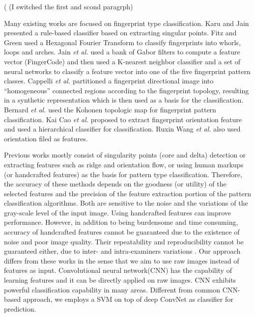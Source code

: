 %
({\color{red} (I switched the first and scond paragrph)}

Many existing works are focused on fingerprint type classification.
%
Karu and Jain \cite{karuJain1996} presented a rule-based classifier based on extracting singular points. 
%
Fitz and Green \cite{FitzGreen1996} used a Hexagonal Fourier Transform to classify fingerprints into whorls, loops and arches. 
%
Jain \textit{et al.} \cite{JainSalil1999} used a bank of Gabor filters to compute a feature vector (FingerCode) and then used a K-nearest neighbor classifier and a set of neural networks to classify a feature vector into one of the five fingerprint pattern classes.
%
Cappelli \textit{et al.} \cite{cappelli1999} partitioned a fingerprint directional image into ``homogeneous'' connected regions according to the fingerprint topology, resulting in a synthetic representation which is then used as a basis for the classification.
%
Bernard \textit{et al.} \cite{Bernard2001} used the Kohonen topologic map for fingerprint pattern classification. 
%
Kai Cao \textit{et al.}\cite{cao2013fingerprint} proposed to extract fingerprint orientation feature and used a hierarchical classifier for classification.
%
Ruxin Wang \textit{et al.} \cite{wang2014fingerprint} also used orientation filed as features. %


Previous works mostly consist of singularity points (core and delta) detection or extracting features such as ridge and orientation flow, or using human markups (or handcrafted features) as the basis for pattern type classification. 
%
Therefore, the accuracy of these methods depends on the goodness (or utility) of the selected features and the precision of the feature extraction portion of the pattern classification algorithms. Both are sensitive to the noise and the variations of the gray-scale level of the input image.  
%
Using handcrafted features can improve performance.  However, in addition to being burdensome and time consuming, accuracy of handcrafted features cannot be guaranteed due to the existence of noise and poor image quality. 
%
Their repeatability and reproducibility cannot be guaranteed either, due to inter- and intra-examiners variations \cite{fbiBlackbox}.  
%
Our approach differs from these works in the sense that we aim to use raw images instead of features as input. Convolutional neural network(CNN) has the capability of learning features and it can be directly applied on raw images. CNN exhibits powerful classification capability in many areas\cite{lecun2015deep}\cite{szegedy2016rethinking}.
%
Different from common CNN-based approach, we employs a SVM on top of deep ConvNet as classifier for prediction.



